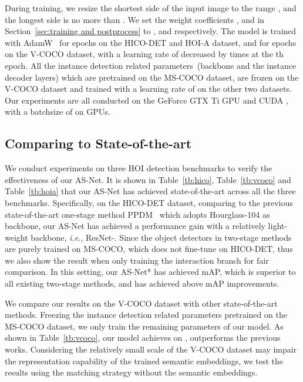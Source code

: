 \documentclass[final]{cvpr}
\begin{document}
During training, we resize the shortest side of the input image to the range , and the longest side is no more than . We set the weight coefficients ,  and  in Section~\ref{sec:training and postprocess} to ,  and  respectively. The model is trained with AdamW~\cite{loshchilov2018decoupled} for  epochs on the HICO-DET and HOI-A dataset, and for  epochs on the V-COCO dataset, with a learning rate of  decreased by  times at the th epoch.
All the instance detection related parameters~(backbone and the instance decoder layers) which are pretrained on the MS-COCO dataset, are frozen on the V-COCO dataset and trained with a learning rate of  on the other two datasets. Our experiments are all conducted on the GeForce GTX Ti GPU and CUDA , with a batchsize of  on  GPUs. 

\vspace{-1.5mm}\subsection{Comparing to State-of-the-art}
\vspace{-1mm}
We conduct experiments on three HOI detection benchmarks to verify the effectiveness of our AS-Net. It is shown in Table~\ref{tb:hico}, Table~\ref{tb:vcoco} and Table~\ref{tb:hoia} that our AS-Net has achieved state-of-the-art across all the three benchmarks. Specifically, on the HICO-DET dataset, comparing to the previous state-of-the-art one-stage method PPDM~\cite{liao2020ppdm} which adopts Hourglass-104 as backbone, our AS-Net has achieved a  performance gain with a relatively light-weight backbone, \emph{i.e.}, ResNet-. Since the object detectors in two-stage methods are purely trained on MS-COCO, which does not fine-tune on HICO-DET, thus we also show the result when only training the interaction branch for fair comparison. In this setting, our AS-Net* has achieved  mAP, which is superior to all existing two-stage methods, and has achieved above  mAP improvements.

We compare our results on the V-COCO dataset with other state-of-the-art methods. Freezing the instance detection related parameters pretrained on the MS-COCO dataset, we only train the remaining parameters of our model. As shown in Table~\ref{tb:vcoco}, our model achieves  on , outperforms the previous works. Considering the relatively small scale of the V-COCO dataset may impair the representation capability of the trained semantic embeddings, we test the results using the matching strategy without the semantic embeddings.
\end{document}
